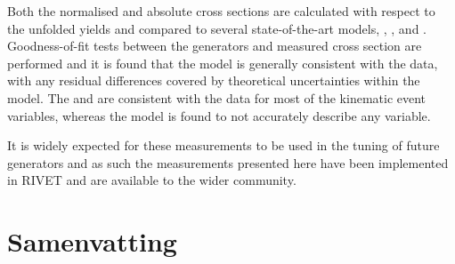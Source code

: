 Both the normalised and absolute cross sections are calculated with respect to the unfolded yields and compared to several state-of-the-art \ttbar{} models, \powhegpythia{}, \powhegherwig{}, \mgamcLO{} and \mgamcNLO{}.
Goodness-of-fit tests between the generators and measured cross section are performed and it is found that the \powhegpythia{} model is generally consistent with the data, with any residual differences covered by theoretical uncertainties within the model.
The \powhegherwig{} and \mgamcNLO{} are consistent with the data for most of the kinematic event variables, whereas the \mgamcLO{} model is found to not accurately describe any variable.

It is widely expected for these measurements to be used in the tuning of future \ttbar{} generators and as such the measurements presented here have been implemented in RIVET and are available to the wider community. 


\chapter*{Samenvatting}
\clearpage

